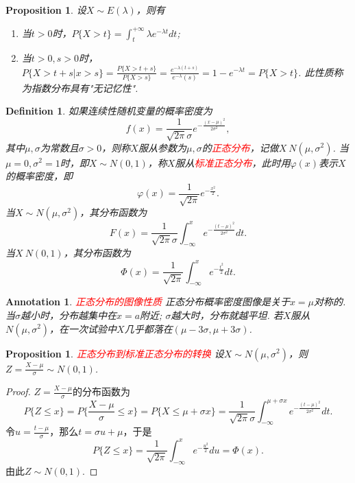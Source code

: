 \documentclass{article}
\newtheorem{proposition}[theorem]{Proposition}
\newtheorem{definition}[theorem]{Definition}
\newtheorem{annotation}[theorem]{Annotation}
\newcommand{\redt}[1]{\textcolor{red}{#1}}
\begin{document}
\begin{proposition}
\rm 设$X \sim E(\lambda)$，则有
\begin{enumerate}
	\item 当$t > 0$时，$P\{X > t\} = \int_t^{+\infty} \lambda e^{-\lambda t}dt$;
	\item 当$t > 0, s >0$时，$P\{X > t+s |x > s\} = \frac{P\{X > t+s \}}{P\{X > s\}} = \frac{e^{-\lambda(t+s)}}{e^{-\lambda}(s)} =1- e^{-\lambda t} = P\{X > t\}$. 此性质称为指数分布具有"无记忆性". 
\end{enumerate}
\end{proposition}

\begin{definition}
\rm 如果连续性随机变量的概率密度为
$$
f(x) = \frac{1}{\sqrt{2\pi}\sigma}e^{-\frac{(x-\mu)^2}{2\sigma^2}},
$$
其中$\mu,\sigma$为常数且$\sigma > 0$，则称$X$服从参数为$\mu,\sigma$的\redt{正态分布}，记做$X~N(\mu,\sigma^2)$. 当$\mu=0,\sigma^2 =1$时，即$X \sim N(0,1)$，称$X$服从\redt{标准正态分布}，此时用$\varphi(x)$表示$X$的概率密度，即
$$
\varphi(x) = \frac{1}{\sqrt{2\pi}}e^{-\frac{x^2}{2}}.
$$
当$X \sim N(\mu,\sigma^2)$，其分布函数为
$$
F(x) = \frac{1}{\sqrt{2\pi}\sigma}\int_{-\infty}^{x}e^{-\frac{(t-\mu)^2}{2\sigma^2}}dt. 
$$
当$X~N(0,1)$，其分布函数为
$$
\Phi(x) = \frac{1}{\sqrt{2\pi}}\int_{-\infty}^x e^{-\frac{t^2}{2}}dt.
$$
\end{definition}

\begin{annotation}
\rm \redt{正态分布的图像性质} 正态分布概率密度图像是关于$x = \mu$对称的. 当$\sigma$越小时，分布越集中在$x=a$附近; $\sigma$越大时，分布就越平坦. 若$X$服从$N(\mu,\sigma^2)$，在一次试验中$X$几乎都落在$(\mu-3\sigma,\mu + 3\sigma)$.
\end{annotation}

\begin{proposition}
\rm \redt{正态分布到标准正态分布的转换} 设$X \sim N(\mu,\sigma^2)$，则$Z = \frac{X-\mu}{\sigma} \sim N(0,1)$. 
\end{proposition}

\begin{proof}
\rm $Z=\frac{X-\mu}{\sigma}$的分布函数为
$$
P\{Z \leq x\} = P\{\frac{X-\mu}{\sigma} \leq x\} = P\{X \leq \mu + \sigma x\} =  \frac{1}{\sqrt{2\pi}\sigma}\int_{-\infty}^{\mu+\sigma x}e^{-\frac{(t-\mu)^2}{2\sigma^2}}dt.
$$
令$u = \frac{t-\mu}{\sigma}$，那么$t = \sigma u + \mu$，于是
$$
P\{Z \leq x\} = \frac{1}{\sqrt{2\pi}}\int_{-\infty}^{x} e^{-\frac{u^2}{2}}du = \Phi(x). 
$$
由此$Z \sim N(0,1)$.
\end{proof}
\end{document}

